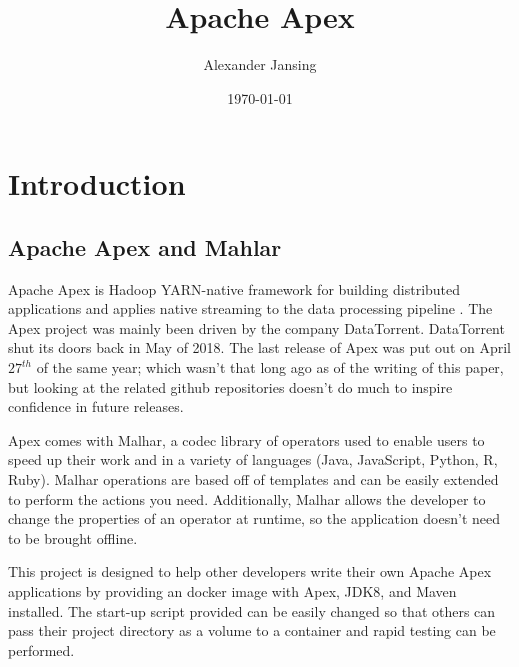 \documentclass[11 pt]{IEEEtran}
\title{Apache Apex}
\author{Alexander Jansing}
\date{\today}
\begin{document}
\maketitle



\section{Introduction}
\subsection{Apache Apex and Mahlar}
Apache Apex is Hadoop YARN-native framework for building distributed applications and applies native streaming to the data processing pipeline \cite{WEISE}. The Apex project was mainly been driven by the company DataTorrent. DataTorrent shut its doors back in May of 2018\cite{WIKI}\cite{DATANAMI}. The last release of Apex was put out on April $27^{th}$ of the same year; which wasn't that long ago as of the writing of this paper, but looking at the related github repositories doesn't do much to inspire confidence in future releases.

Apex comes with Malhar, a codec library of operators used to enable users to speed up their work and in a variety of languages (Java, JavaScript, Python, R, Ruby). Malhar operations are based off of templates and can be easily extended to perform the actions you need. Additionally, Malhar allows the developer to change the properties of an operator at runtime, so the application doesn't need to be brought offline\cite{MALHAR}.

This project is designed to help other developers write their own Apache Apex applications by providing an docker image with Apex, JDK8, and Maven installed. The start-up script provided can be easily changed so that others can pass their project directory as a volume to a container and rapid testing can be performed.
\end{document}
